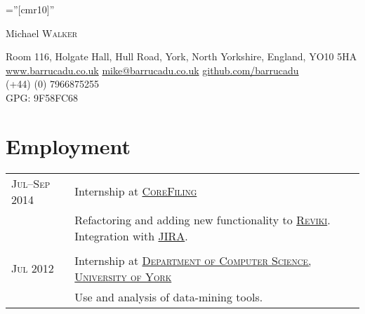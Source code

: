 \documentclass[a4paper,10pt]{article}
\newcommand{\schref}[2]{\href{#1}{\textsc{#2}}}
\newcommand{\mhref}[1]{\href{mailto:#1}{#1}}
\newcommand{\hhref}[1]{\href{http://#1}{#1}}
\newenvironment{cvtable}{\begin{tabular}{x{2cm}|p{11.6cm}}}{\end{tabular}}
\newcommand{\when}[1]{\heading{#1}}
\newcommand{\heading}[1]{\textsc{#1} &}
\newcommand{\detail}[1]{& \footnotesize{#1}}
\begin{document}
\pagestyle{empty} %

\font\fb=''[cmr10]'' %

\par{\centering
		{\Huge Michael \textsc{Walker}
	}\bigskip\par}

{\centering
Room 116, Holgate Hall, Hull Road, York, North Yorkshire, England,
YO10 5HA\\
\hhref{www.barrucadu.co.uk} \mhref{mike@barrucadu.co.uk} \hhref{github.com/barrucadu} \\
(+44) (0) 7966875255\\
GPG: 9F58FC68\\
}

\section{Employment}
\begin{cvtable}
  \when{Jul--Sep 2014} Internship at \schref{http://www.corefiling.com/}{CoreFiling}\\
  \detail{Refactoring and adding new functionality to \schref{https://github.com/CoreFiling/reviki}{Reviki}.
    Integration with \schref{https://www.atlassian.com/software/jira}{JIRA}.}\\\\

  \when{Jul 2012} Internship at \schref{http://cs.york.ac.uk}{Department of Computer Science, University of York} \\
  \detail{Use and analysis of data-mining tools.}

\end{cvtable}
\end{document}
